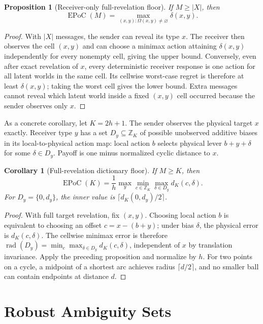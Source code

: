 \documentclass[letterpaper,10pt]{article}
\newtheorem{proposition}[theorem]{Proposition}
\newtheorem{corollary}[theorem]{Corollary}
\newcommand{\EPoC}{\operatorname{EPoC}}
\begin{document}
\begin{proposition}[Receiver-only full-revelation floor]
If $M\ge |X|$, then
\[
\EPoC(M)=\max_{(x,y):\Omega(x,y)\ne\varnothing}\delta(x,y).
\]
\end{proposition}
\begin{proof}
With $|X|$ messages, the sender can reveal its type $x$. The receiver then
observes the cell $(x,y)$ and can choose a minimax action attaining
$\delta(x,y)$ independently for every nonempty cell, giving the upper bound.
Conversely, even after exact revelation of $x$, every deterministic receiver
response is one action for all latent worlds in the same cell. Its cellwise
worst-case regret is therefore at least $\delta(x,y)$; taking the worst cell
gives the lower bound. Extra messages cannot reveal which latent world inside a
fixed $(x,y)$ cell occurred because the sender observes only $x$.
\end{proof}

As a concrete corollary, let $K=2h+1$. The sender observes the physical target
$x$ exactly. Receiver type $y$ has a set $D_y\subseteq\mathbb Z_K$ of possible
unobserved additive biases in its local-to-physical action map: local action
$b$ selects physical lever $b+y+\delta$ for some $\delta\in D_y$. Payoff is one
minus normalized cyclic distance to $x$.

\begin{corollary}[Full-revelation dictionary floor]
If $M\ge K$, then
\[
\EPoC(K)=\frac{1}{h}\max_y
\min_{c\in\mathbb Z_K}\max_{\delta\in D_y}d_K(c,\delta).
\]
For $D_y=\{0,d_y\}$, the inner value is
$\lceil d_K(0,d_y)/2\rceil$.
\end{corollary}
\begin{proof}
With full target revelation, fix $(x,y)$. Choosing local action $b$ is
equivalent to choosing an offset $c=x-(b+y)$; under bias $\delta$, the physical
error is $d_K(c,\delta)$. The cellwise minimax error is therefore
$\operatorname{rad}(D_y)=\min_c\max_{\delta\in D_y}d_K(c,\delta)$,
independent of $x$ by translation invariance. Apply the preceding proposition
and normalize by $h$. For two points on a cycle, a midpoint of a shortest arc
achieves radius $\lceil d/2\rceil$, and no smaller ball can contain endpoints
at distance $d$.
\end{proof}

\section{Robust Ambiguity Sets}
\end{document}
